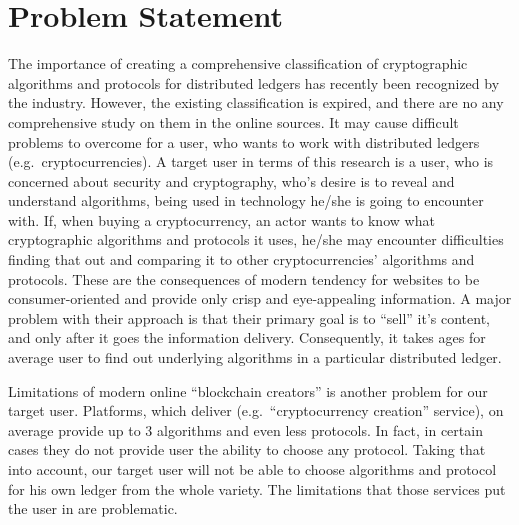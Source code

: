 \documentclass[12pt]{article}
\begin{document}
\section{Problem Statement}
The importance of creating a comprehensive classification of cryptographic
algorithms and protocols for distributed ledgers has recently been recognized
by the industry. However, the existing classification is expired, and there are
no any comprehensive study on them in the online sources. It may cause
difficult problems to overcome for a user, who wants to work with distributed
ledgers (e.g.\ cryptocurrencies). A {target user}\label{user} in terms of this research is a
user, who is concerned about security and cryptography, who's desire is to
reveal and understand algorithms, being used in technology he/she is going to
encounter with. If, when buying a cryptocurrency, an actor
wants to know what cryptographic algorithms and protocols it uses, he/she may
encounter difficulties finding that out and comparing it to other
cryptocurrencies' algorithms and protocols. These are the consequences of
modern tendency for websites to be consumer-oriented and provide only crisp and
eye-appealing information. A major problem with their approach is that their
primary goal is to ``sell'' it's content, and only after it goes the
information delivery. Consequently, it takes ages for average user to find out
underlying algorithms in a particular distributed ledger.

Limitations of modern online ``blockchain creators'' is another problem for our
target user. Platforms, which deliver (e.g.\ ``cryptocurrency creation''
service), on average provide up to 3 algorithms and even less protocols. In
fact, in certain cases they do not provide user the ability to choose any
protocol. Taking that into account, our target user will not be able to choose
algorithms and protocol for his own ledger from the whole variety. The
limitations that those services put the user in are problematic.
\end{document}
